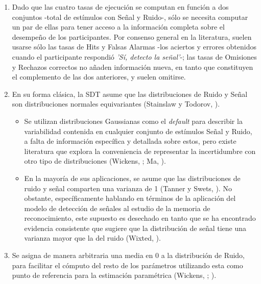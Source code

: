 \begin{enumerate}

\item  Dado que las cuatro tasas de ejecución se computan en función a dos conjuntos -total de estímulos con Señal y Ruido-, sólo se necesita computar un par de ellas para tener acceso a la información completa sobre el desempeño de los participantes. Por consenso general en la literatura, suelen usarse sólo las tasas de Hits y Falsas Alarmas -los aciertos y errores obtenidos cuando el participante respondió \textit{'Sí, detecto la señal'}-; las tasas de Omisiones y Rechazos correctos no añaden información nueva, en tanto que constituyen el complemento de las dos anteriores, y suelen omitirse.\\

\item En su forma clásica, la SDT asume que las distribuciones de Ruido y Señal son distribuciones normales equivariantes (Stainslaw y Todorov, \citeyear{Stainslaw1999}).\\
  \begin{itemize}
  \item Se utilizan distribuciones Gaussianas como el \textit{default} para describir la variabilidad contenida en cualquier conjunto de estímulos Señal y Ruido, a falta de información específica y detallada sobre estos, pero existe literatura que explora la conveniencia de representar la incertidumbre con otro tipo de distribuciones (Wickens, \citeyear{Wickens1}; Ma, \citeyear{WeijiMa2009}).\\
  \item En la mayoría de sus aplicaciones, se asume que las distribuciones de ruido y señal comparten una varianza de 1 (Tanner y Swets, \citeyear{Tanner1954}). No obstante, específicamente hablando en términos de la aplicación del modelo de detección de señales al estudio de la memoria de reconocimiento, este supuesto es desechado en tanto que se ha encontrado evidencia consistente que sugiere que la distribución de señal tiene una varianza mayor que la del ruido (Wixted, \citeyear{Wixted2007}).\\
  \end{itemize}

\item Se asigna de manera arbitraria una media en 0 a la distribución de Ruido, para facilitar el cómputo del resto de los parámetros utilizando esta  como punto de referencia para la estimación paramétrica (Wickens, \citeyear{Wickens1}; \citeyear{Gescheider}).\\


\end{enumerate}
